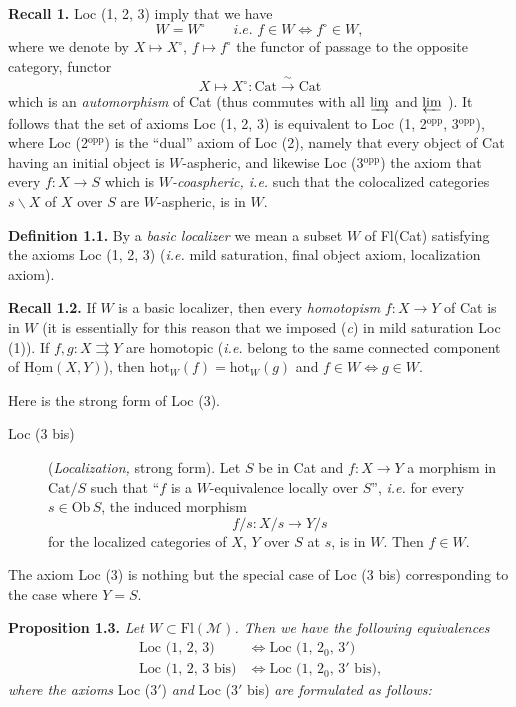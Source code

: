 \documentclass[11pt]{article}
\newcommand{\printedpage}[1]{\marginpar{\footnotesize p.~#1}}
\newcommand{\msp}[1]{\marginpar{\footnotesize [#1]}}
\newcommand{\Cat}{\mathrm{Cat}}
\newcommand{\Ob}{\mathrm{Ob}\,}
\newcommand{\hot}{\mathrm{hot}}
\begin{document}
\textbf{Recall 1.} Loc (1, 2, 3) imply that we have
\[
W = W^\circ \qquad \textit{i.e. } f \in W \iff f^\circ \in W,
\]
\printedpage{2}
where we denote by $X \longmapsto X^\circ$, $f \longmapsto f^\circ$ the functor of passage to the opposite category, functor
\[
X \longmapsto X^\circ : \Cat \xrightarrow{\ \sim\ } \Cat
\]
which is an \textit{automorphism} of Cat (thus commutes with all $\varinjlim$ and $\varprojlim$ ). It follows that the set of axioms Loc (1, 2, 3) is equivalent to Loc (1, 2$^{\mathrm{opp}}$, 3$^{\mathrm{opp}}$), where Loc (2$^{\mathrm{opp}}$) is the ``dual'' axiom of Loc (2), namely that every object of Cat having an initial object is $W$-aspheric, and likewise Loc (3$^{\mathrm{opp}}$) the axiom that every $f : X \longrightarrow S$ which is $W$\textit{-coaspheric, i.e.} such that the colocalized categories $s\backslash X$ of $X$ over $S$ are $W$-aspheric, is in $W$.

\textbf{Definition 1.1.} By a \textit{basic localizer} we mean a subset $W$ of Fl(Cat) satisfying the axioms Loc (1, 2, 3) (\textit{i.e.} mild saturation, final object axiom, localization axiom).

\msp{page 3}

\textbf{Recall 1.2.} If $W$ is a basic localizer, then every \textit{homotopism} $f : X \longrightarrow Y$ of Cat is in $W$ (it is essentially for this reason that we imposed (\textit{c}) in mild saturation Loc (1)). If $f, g : X \rightrightarrows Y$ are homotopic (\textit{i.e.} belong to the same connected component of $\underline{\mathrm{Hom}}(X, Y)$), then $\hot_W(f) = \hot_W(g)$ and $f \in W \iff g \in W$.

Here is the strong form of Loc (3).

\begin{description}
\item[Loc (3 bis)] (\textit{Localization,} strong form). Let $S$ be in Cat and $f : X \longrightarrow Y$ a morphism in $\Cat/S$ such that ``$f$ is a $W$-equivalence locally over $S$'', \textit{i.e.} for every $s \in \Ob S$, the induced morphism
\[
f/s : X/s \longrightarrow Y/s
\]
for the localized categories of $X$, $Y$ over $S$ at $s$, is in $W$. Then $f \in W$.
\end{description}

The axiom Loc (3) is nothing but the special case of Loc (3 bis) corresponding to the case where $Y = S$.

\textbf{Proposition 1.3.} \textit{Let $W \subset \mathrm{Fl}(\mathcal{M})$. Then we have the following equivalences}
\[
\begin{aligned}
\text{Loc (1, 2, 3)} &\iff \text{Loc (1, $2_0$, $3'$)}\\
\text{Loc (1, 2, 3 bis)} &\iff \text{Loc (1, $2_0$, $3'$ bis),}
\end{aligned}
\]
\textit{where the axioms} Loc ($3'$) \textit{and} Loc ($3'$ bis) \textit{are formulated as follows:}
\end{document}
